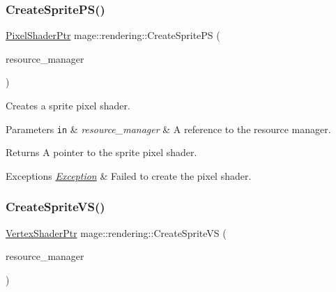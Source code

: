 \subsubsection{\texorpdfstring{Create\+Sprite\+P\+S()}{CreateSpritePS()}}
{\footnotesize\ttfamily \mbox{\hyperlink{namespacemage_1_1rendering_af03d922b228ee9c8542baaa2ecc9f259}{Pixel\+Shader\+Ptr}} mage\+::rendering\+::\+Create\+Sprite\+PS (\begin{DoxyParamCaption}\item[{\mbox{\hyperlink{classmage_1_1rendering_1_1_resource_manager}{Resource\+Manager}} \&}]{resource\+\_\+manager }\end{DoxyParamCaption})}

Creates a sprite pixel shader.


\begin{DoxyParams}[1]{Parameters}
\mbox{\tt in}  & {\em resource\+\_\+manager} & A reference to the resource manager. \\
\hline
\end{DoxyParams}
\begin{DoxyReturn}{Returns}
A pointer to the sprite pixel shader. 
\end{DoxyReturn}

\begin{DoxyExceptions}{Exceptions}
{\em \mbox{\hyperlink{classmage_1_1_exception}{Exception}}} & Failed to create the pixel shader. \\
\hline
\end{DoxyExceptions}
\mbox{\label{namespacemage_1_1rendering_a52f27cd68ea8d18864fd9bc1c53cccc4}} 
\subsubsection{\texorpdfstring{Create\+Sprite\+V\+S()}{CreateSpriteVS()}}
{\footnotesize\ttfamily \mbox{\hyperlink{namespacemage_1_1rendering_aaf704b9c54a4181f4950a1761de69dda}{Vertex\+Shader\+Ptr}} mage\+::rendering\+::\+Create\+Sprite\+VS (\begin{DoxyParamCaption}\item[{\mbox{\hyperlink{classmage_1_1rendering_1_1_resource_manager}{Resource\+Manager}} \&}]{resource\+\_\+manager }\end{DoxyParamCaption})}

